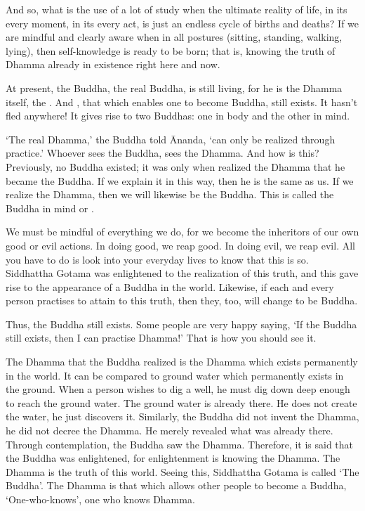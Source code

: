 And so, what is the use of a lot of study when the ultimate reality of life, in its every moment, in its every act, is just an endless cycle of births and deaths? If we are mindful and clearly aware when in all postures (sitting, standing, walking, lying), then self-knowledge is ready to be born; that is, knowing the truth of Dhamma already in existence right here and now. 

At present, the Buddha, the real Buddha, is still living, for he is the Dhamma itself, the . And , that which enables one to become Buddha, still exists. It hasn't fled anywhere! It gives rise to two Buddhas: one in body and the other in mind. 

`The real Dhamma,' the Buddha told \=Ananda, `can only be realized through practice.' Whoever sees the Buddha, sees the Dhamma. And how is this? Previously, no Buddha existed; it was only when  realized the Dhamma that he became the Buddha. If we explain it in this way, then he is the same as us. If we realize the Dhamma, then we will likewise be the Buddha. This is called the Buddha in mind or . 

We must be mindful of everything we do, for we become the inheritors of our own good or evil actions. In doing good, we reap good. In doing evil, we reap evil. All you have to do is look into your everyday lives to know that this is so. Siddhattha Gotama was enlightened to the realization of this truth, and this gave rise to the appearance of a Buddha in the world. Likewise, if each and every person practises to attain to this truth, then they, too, will change to be Buddha. 

Thus, the Buddha still exists. Some people are very happy saying, `If the Buddha still exists, then I can practise Dhamma!' That is how you should see it. 

The Dhamma that the Buddha realized is the Dhamma which exists permanently in the world. It can be compared to ground water which permanently exists in the ground. When a person wishes to dig a well, he must dig down deep enough to reach the ground water. The ground water is already there. He does not create the water, he just discovers it. Similarly, the Buddha did not invent the Dhamma, he did not decree the Dhamma. He merely revealed what was already there. Through contemplation, the Buddha saw the Dhamma. Therefore, it is said that the Buddha was enlightened, for enlightenment is knowing the Dhamma. The Dhamma is the truth of this world. Seeing this, Siddhattha Gotama is called `The Buddha'. The Dhamma is that which allows other people to become a Buddha, `One-who-knows', one who knows Dhamma. 

